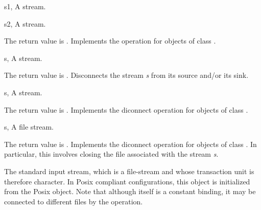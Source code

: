 \begin{optDefinition}
\begin{specargs}
    \item[s1, \classref{stream}] A stream.
    \item[s2, \classref{stream}] A stream.
\end{specargs}
%
\result%
The return value is \nil.
%
\remarks%
Implements the  operation for objects of class
.

\begin{genericargs}
    \item[s, \classref{stream}] A stream.
\end{genericargs}
%
\result%
The return value is \nil.
%
\remarks%
Disconnects the stream {\em s\/} from its source and/or its sink.

\begin{specargs}
    \item[s, \classref{stream}] A stream.
\end{specargs}
%
\result%
The return value is \nil.
%
\remarks%
Implements the diconnect operation for objects of class .

\begin{specargs}
    \item[s, \classref{file-stream}] A file stream.
\end{specargs}
%
\result%
The return value is \nil.
%
\remarks%
Implements the diconnect operation for objects of class
. In particular, this involves closing the file associated
with the stream {\em s}.


\remarks%
The standard input stream, which is a file-stream and whose transaction unit is
therefore character. In Posix compliant configurations, this object is
initialized from the Posix  object. Note that although
 itself is a constant binding, it may be connected to
different files by the  operation.


\end{optDefinition}

